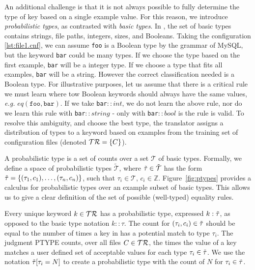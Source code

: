 An additional challenge is that it is not always possible to fully determine the type of key based on a single example value. 
For this reason, we introduce \textit{probabilistic types}, as contrasted with \textit{basic types}.
In \app, the set of basic types contains strings, file paths, integers, sizes, and Booleans. 
Taking the configuration \ref{lst:file1.cnf}, we can assume {\tt foo} is a Boolean type by the grammar of MySQL,
  but the keyword {\tt bar} could be many types.
If we choose the type based on the first example, {\tt bar} will be a integer type.
If we choose a type that fits all examples, {\tt bar} will be a string.
However the correct classification needed is a Boolean type.
For illustrative purposes, let us assume that there is a critical rule we must learn where tow Boolean keywords should always have the same values, \textit{e.g.} $eq(\texttt{foo},\texttt{bar})$.
If we take {\tt bar}$::int$, we do not learn the above rule, nor do we learn this rule with {\tt bar}$::string$ - only with {\tt bar}$::bool$ is the rule is valid.
To resolve this ambiguity, and choose the best type, the translator assigns a distribution of types to a keyword based on examples from the training set of configuration files (denoted $\mathcal{TR}=\{C\}$).
 

A probabilistic type is a set of counts over a set $\mathcal{T}$ of basic types.
Formally, we define a space of probabilistic types $\tilde{\mathcal{T}}$, where $\tilde{\tau} \in \tilde{\mathcal{T}}$ has the form $\tilde{\tau}=\{(\tau_1, c_1),\ldots,(\tau_n, c_n)\}$, such that $\tau_i \in \mathcal{T}$, $c_i \in \mathbb{Z}$. 
Figure~\ref{fig:ptypes} provides a calculus for probabilistic types over an example subset of basic types.
This allows us to give a clear definition of the set of possible (\ie well-typed) equality rules.

Every unique keyword $k \in \mathcal{TR}$ has a probabilistic type, expressed $k:\tilde{\tau}$, as opposed to the basic type notation $k::\tau$.
The count for $(\tau_i,c_i) \in \tilde{\tau}$ should be equal to the number of times a key in \trainingSet has a potential match to type $\tau_i$.
The judgment {\scriptsize PTYPE} counts, over all files $C \in \mathcal{TR}$, the times the value of a key matches a user defined set of acceptable values for each type $\tau_i \in \tilde{\tau}$.
We use the notation $\tilde{\tau}[\tau_i=N]$ to create a probabilistic type with the count of $N$ for $\tau_i \in \tilde{\tau}$.

